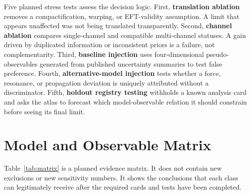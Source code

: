 \documentclass[conference]{IEEEtran}
\begin{document}
Five planned stress tests assess the decision logic. First, \textbf{translation ablation} removes a compactification, warping, or EFT-validity assumption. A limit that appears unaffected was not being translated transparently. Second, \textbf{channel ablation} compares single-channel and compatible multi-channel statuses. A gain driven by duplicated information or inconsistent priors is a failure, not complementarity. Third, \textbf{baseline injection} uses four-dimensional pseudo-observables generated from published uncertainty summaries to test false preference. Fourth, \textbf{alternative-model injection} tests whether a force, resonance, or propagation deviation is uniquely attributed without a discriminator. Fifth, \textbf{holdout registry testing} withholds a known analysis card and asks the atlas to forecast which model-observable relation it should constrain before seeing its final limit.

\section{Model and Observable Matrix}

Table~\ref{tab:matrix} is a planned evidence matrix. It does not contain new exclusions or new sensitivity numbers. It shows the conclusions that each class can legitimately receive after the required cards and tests have been completed.
\end{document}
